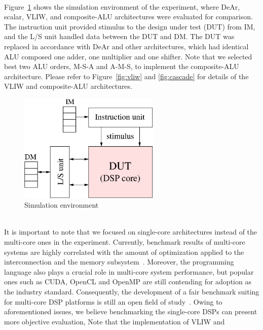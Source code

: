 \\\indent Figure~\ref{fig:sim} shows the simulation environment of the experiment, 
where DeAr, scalar, VLIW, and composite-ALU architectures \cite{cascade} were evaluated for comparison. 
The instruction unit provided stimulus to the design under test (DUT) from IM,
and the L/S unit handled data between the DUT and DM.
The DUT was replaced in accordance with DeAr and other architectures, 
which had identical ALU composed one adder, one multiplier and one shifter.
Note that we selected best two ALU orders, M-S-A and A-M-S, to implement the composite-ALU architecture.
Please refer to Figure~\ref{fig:vliw} and \ref{fig:cascade} for details of the VLIW and composite-ALU architectures.
\vspace{\textfig}
\begin{figure}[!ht] 
    \centering
    \includegraphics[width=0.6\textwidth]{./figs/sim.eps}
    \caption{Simulation environment}
    \label{fig:sim}
\end{figure}
\\\indent It is important to note that we focused on single-core architectures instead of the multi-core ones in the experiment.
Currently, benchmark results of multi-core systems are highly correlated with the amount of optimization applied to the interconnection and the memory subsystem~\cite{trends}.
Moreover, the programming language also plays a crucial role in multi-core system performance, 
but popular ones such as CUDA, OpenCL and OpenMP are still contending for adoption as the industry standard.
Consequently, the development of a fair benchmark suiting for multi-core DSP platforms is still an open field of study~\cite{landscape}.
Owing to aforementioned issues, we believe benchmarking the single-core DSPs can present more objective evaluation, 
Note that the implementation of VLIW and 
